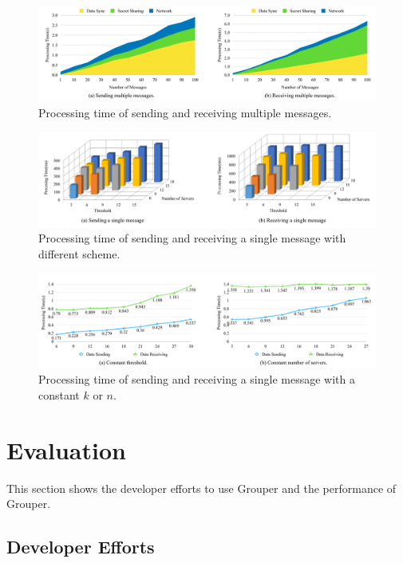 \documentclass[twocolumn,10pt]{article}
\begin{document}
\begin{figure}[t]
	\centering
	\includegraphics[scale=0.13]{multiple_messages}
	\caption{Processing time of sending and receiving multiple messages.}
\end{figure}

\begin{figure}[t]
	\centering
	\includegraphics[scale=0.35]{3d}
	\caption{Processing time of sending and receiving a single message with different scheme.}
\end{figure}

\begin{figure}[t]
	\centering
	\includegraphics[scale=0.13]{constant_k_n}
	\caption{Processing time of sending and receiving a single message with a constant ${k}$ or ${n}$.}
\end{figure}

\section{Evaluation}

This section shows the developer efforts to use Grouper and the performance of Grouper.

\subsection{Developer Efforts}
\end{document}
